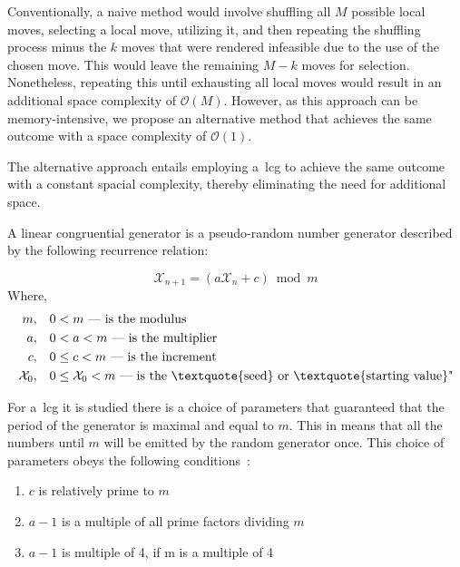 Conventionally, a naive method would involve shuffling all $M$ possible local
moves, selecting a local move, utilizing it, and then repeating the shuffling
process minus the $k$ moves that were rendered infeasible due to the use of the
chosen move. This would leave the remaining $M - k$ moves for selection.
Nonetheless, repeating this until exhausting all local moves would result in an
additional space complexity of $\mathcal{O}(M)$. However, as this approach can
be memory-intensive, we propose an alternative method that achieves the same
outcome with a space complexity of $\mathcal{O}(1)$.

The alternative approach entails employing a~\acrfull{lcg} to achieve the same
outcome with a constant spacial complexity, thereby eliminating the need for
additional space.

\begin{definition}
  A linear congruential generator is a pseudo-random number generator
  described by the following recurrence relation:

  \begin{equation}
    \mathcal{X}_{n+1} = (a\mathcal{X}_{n} + c) \bmod m
  \end{equation}
  Where,
  \begin{align*}
    m,               & \quad 0 < m \text{ — is the modulus}                                                              \\
    a,               & \quad 0 < a < m \text{ — is the multiplier}                                                       \\
    c,               & \quad 0 \leq c < m \text{ — is the increment}                                                     \\
    \mathcal{X}_{0}, & \quad 0 \leq \mathcal{X}_{0} < m \text{ — is the \textquote{seed} or \textquote{starting value}"}
  \end{align*}
\end{definition}

For a~\acrshort{lcg} it is studied there is a choice of parameters that
guaranteed that the period of the generator is maximal and equal to $m$. This in
means that all the numbers until $m$ will be emitted by the random generator
once. This choice of parameters obeys the following
conditions~\cite{knuth2014art}:

\begin{enumerate}
  \item $c$ is relatively prime to $m$
  \item $a - 1$ is a multiple of all prime factors dividing $m$
  \item $a - 1$ is multiple of 4, if m is a multiple of 4
\end{enumerate}

